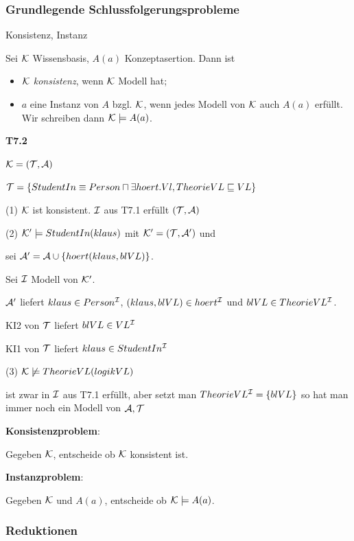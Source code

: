 \subsubsection{Grundlegende Schlussfolgerungsprobleme}

\begin{definition}{Konsistenz, Instanz}

Sei $\mathcal{K}$ Wissensbasis, $A(a)$ Konzeptasertion. Dann ist

\begin{itemize}
	\item $\mathcal{K}$ \emph{konsistenz}, wenn $\mathcal{K}$ Modell hat;
	\item $a$ eine Instanz von $A$ bzgl. $\mathcal{K}$, wenn jedes Modell von $\mathcal{K}$ auch $A(a)$ erfüllt. Wir schreiben dann $\mathcal{K} \models A(a)$.
\end{itemize}
\end{definition}

\textbf{T7.2}

$\mathcal{K} = (\mathcal{T}, \mathcal{A})$

$\mathcal{T} = \{StudentIn \equiv Person \sqcap \exists hoert.Vl, TheorieVL \sqsubseteq VL\}$

(1) $\mathcal{K}$ ist konsistent. $\mathcal{I}$ aus T7.1 erfüllt $(\mathcal{T},\mathcal{A})$

(2) $\mathcal{K}' \models StudentIn(klaus)$ mit $\mathcal{K}' = (\mathcal{T}, \mathcal{A}')$ und 

sei $\mathcal{A}' = \mathcal{A} \cup \{hoert(klaus,blVL)\}$.

Sei $\mathcal{I}$ Modell von $\mathcal{K}'$. 

$\mathcal{A}'$ liefert $klaus \in Person^{\mathcal{I}}$, $(klaus,blVL) \in hoert^{\mathcal{I}}$ und $blVL \in TheorieVL^{\mathcal{I}}$.

KI2 von $\mathcal{T}$ liefert $blVL \in VL^{\mathcal{I}}$

KI1 von $\mathcal{T}$ liefert $klaus \in StudentIn^{\mathcal{I}}$

(3) $\mathcal{K} \not\models TheorieVL(logikVL)$

    ist zwar in $\mathcal{I}$ aus T7.1 erfüllt, aber setzt man $TheorieVL^{\mathcal{I}} = \{blVL \}$ so hat man immer noch ein Modell von $\mathcal{A},\mathcal{T}$ 

\textbf{Konsistenzproblem}:

Gegeben $\mathcal{K}$, entscheide ob $\mathcal{K}$ konsistent ist.

\textbf{Instanzproblem}:

Gegeben $\mathcal{K}$ und $A(a)$, entscheide ob $\mathcal{K} \models A(a)$.

\subsubsection{Reduktionen}

